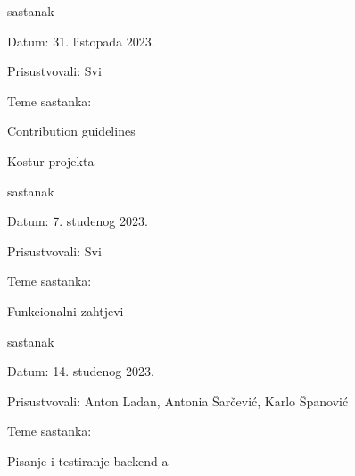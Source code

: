\begin{packed_enum}
\begin{packed_item}
\end{packed_item}

\item sastanak

\item[] \begin{packed_item}

	\item Datum: 31. listopada 2023.
	\item Prisustvovali: Svi
	\item Teme sastanka:
		\begin{packed_item}

		\item Contribution guidelines
		\item Kostur projekta

		\end{packed_item}

\end{packed_item}

\item sastanak

\item[] \begin{packed_item}

	\item Datum: 7. studenog 2023.
	\item Prisustvovali: Svi
	\item Teme sastanka:
		\begin{packed_item}

		\item Funkcionalni zahtjevi

		\end{packed_item}

\end{packed_item}

\item sastanak

\item[] \begin{packed_item}

	\item Datum: 14. studenog 2023.
	\item Prisustvovali: Anton Ladan, Antonia Šarčević, Karlo Španović
	\item Teme sastanka:
		\begin{packed_item}

		\item Pisanje i testiranje backend-a

		\end{packed_item}

\end{packed_item}

%

\end{packed_enum}

